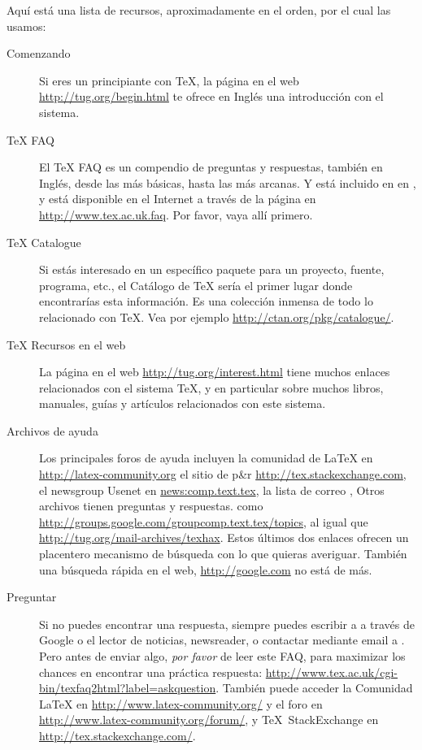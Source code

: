 \documentclass{article}
\begin{document}
Aquí está una lista de recursos, aproximadamente en el orden, por el
cual las usamos:

\begin{description}
	\item[Comenzando] Si eres un principiante con \TeX, la página en el
	web \url{http://tug.org/begin.html} te ofrece en Inglés una
	introducción con el sistema.

\item [\TeX{} FAQ] El \TeX{} FAQ es un compendio de preguntas y
respuestas, también en Inglés, desde las más básicas, hasta las más
arcanas. Y está incluido en \TL{} en
, y está disponible en el
Internet a través de la página en \url{http://www.tex.ac.uk.faq}. Por
favor, vaya allí primero.  \item [\TeX{} Catalogue] Si estás
	interesado en un específico paquete para un proyecto, fuente,
	programa, etc., el Catálogo de \TeX{} sería el primer lugar
	donde encontrarías esta información. Es una colección inmensa
	de todo lo relacionado con \TeX{}. Vea por ejemplo
	\url{http://ctan.org/pkg/catalogue/}.

\item [\TeX{} Recursos en el web] La página en el web
	\url{http://tug.org/interest.html} tiene muchos enlaces
	relacionados con el sistema \TeX{}, y en particular sobre
	muchos libros, manuales, guías y artículos relacionados con
	este sistema.

\item [Archivos de ayuda] Los principales foros de ayuda incluyen la comunidad
	de \LaTeX{} en \url{http://latex-community.org} el sitio de p\&r
		\url{http://tex.stackexchange.com}, el newsgroup Usenet en
		\url{news:comp.text.tex}, la lista de correo
		, Otros archivos tienen preguntas y
		respuestas.  como
		\url{http://groups.google.com/groupcomp.text.tex/topics}, al
		igual que \url{http://tug.org/mail-archives/texhax}. Estos
		últimos dos enlaces ofrecen un placentero mecanismo de búsqueda
		con lo que quieras averiguar.  También una búsqueda rápida en
		el web, \url{http://google.com} no está de más.

\item [Preguntar] Si no puedes encontrar una respuesta, siempre puedes
	escribir a  a través de Google o el
	lector de noticias, newsreader, o contactar mediante email a
	. Pero antes de enviar algo, \emph{por
	favor} de leer este FAQ, para maximizar los chances en
	encontrar una práctica respuesta:
	\url{http://www.tex.ac.uk/cgi-bin/texfaq2html?label=askquestion}.
	También puede acceder la Comunidad \LaTeX{} en
	\url{http://www.latex-community.org/} y el foro en
	\url{http://www.latex-community.org/forum/}, y \TeX\
	StackExchange en \url{http://tex.stackexchange.com/}.


\end{description}
\end{document}
